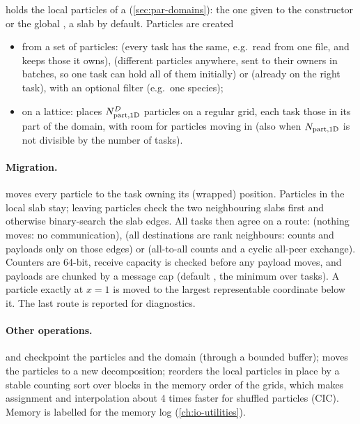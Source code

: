  holds the local particles of a  (\cref{sec:par-domains}): the one given to the constructor or
the global , a slab by default. Particles are created
\begin{itemize}
\item from a set of particles:  (every task has the same, e.g.\ read from one file, and keeps those it
      owns),  (different particles anywhere, sent to their owners in batches, so one task can hold all
      of them initially) or  (already on the right task), with an optional filter (e.g.\ one species);
\item on a lattice:  places $N_{\rm part,1D}^D$ particles on a regular grid,
      each task those in its part of the domain, with room for particles moving in (also when $N_{\rm part,1D}$ is not divisible by
      the number of tasks).
\end{itemize}

\paragraph*{Migration.}  moves every particle to the task owning its (wrapped) position.
Particles in the local slab stay; leaving particles check the two neighbouring slabs first and otherwise binary-search the slab
edges. All tasks then agree on a route:  (nothing moves: no communication),  (all destinations
are rank neighbours: counts and payloads only on those edges) or  (all-to-all counts and a cyclic all-peer
exchange). Counters are 64-bit, receive capacity is checked before any payload moves, and payloads are chunked by a message cap
(default , the minimum over tasks). A particle exactly at $x=1$ is moved to the largest representable coordinate
below it. The last route is reported for diagnostics.

\paragraph*{Other operations.}  and  checkpoint the particles and the domain (through a
bounded buffer);  moves the particles to a new decomposition;  reorders the local
particles in place by a stable counting sort over blocks in the memory order of the grids, which makes assignment and
interpolation about 4 times faster for shuffled particles (CIC). Memory is labelled for the memory log (\cref{ch:io-utilities}).

